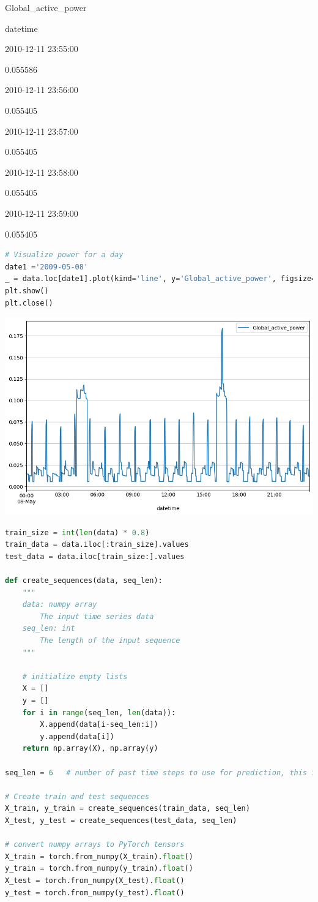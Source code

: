 Global\_active\_power

datetime

2010-12-11 23:55:00

0.055586

2010-12-11 23:56:00

0.055405

2010-12-11 23:57:00

0.055405

2010-12-11 23:58:00

0.055405

2010-12-11 23:59:00

0.055405

\begin{lstlisting}[language=Python]
# Visualize power for a day
date1 ='2009-05-08'
_ = data.loc[date1].plot(kind='line', y='Global_active_power', figsize=(10,6), grid=True)
plt.show()
plt.close()
\end{lstlisting}

\includegraphics{img/rnn/intro/output_5_0_household.png}

\begin{lstlisting}[language=Python]
train_size = int(len(data) * 0.8)
train_data = data.iloc[:train_size].values
test_data = data.iloc[train_size:].values

def create_sequences(data, seq_len):
    """
    data: numpy array
        The input time series data
    seq_len: int
        The length of the input sequence
    """

    # initialize empty lists
    X = []
    y = []
    for i in range(seq_len, len(data)):
        X.append(data[i-seq_len:i])
        y.append(data[i])
    return np.array(X), np.array(y)

seq_len = 6   # number of past time steps to use for prediction, this is a hyperparameter

# Create train and test sequences
X_train, y_train = create_sequences(train_data, seq_len)
X_test, y_test = create_sequences(test_data, seq_len)

# convert numpy arrays to PyTorch tensors
X_train = torch.from_numpy(X_train).float()
y_train = torch.from_numpy(y_train).float()
X_test = torch.from_numpy(X_test).float()
y_test = torch.from_numpy(y_test).float()
\end{lstlisting}

